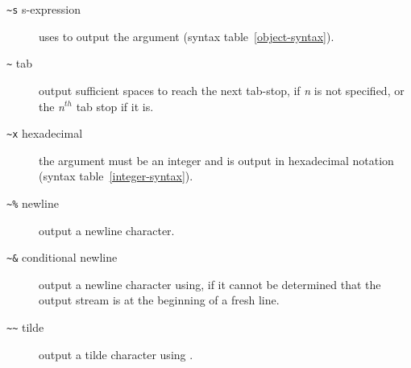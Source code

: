 \begin{optDefinition}
\begin{description}
    \item[{\tt\textasciitilde s} s-expression]%
    uses  to output the argument (syntax
    table~\ref{object-syntax}).

    \item[{\tt\textasciitilde}\true\/ tab]%
    output sufficient spaces to reach the next tab-stop, if {\em n\/} is not
    specified, or the {\em n$^{th}$} tab stop if it is.

    \item[{\tt\textasciitilde x} hexadecimal]%
    the argument must be an integer and is output in hexadecimal notation
    (syntax table~\ref{integer-syntax}).

    \item[{\tt\textasciitilde \%} newline]%
    output a newline character.

    \item[{\tt\textasciitilde \&} conditional newline]%
    output a newline character using, if it cannot be determined that the output
    stream is at the beginning of a fresh line.

    \item[{\tt\textasciitilde \textasciitilde} tilde]%
    output a tilde character using .
\end{description}
%
\end{optDefinition}
